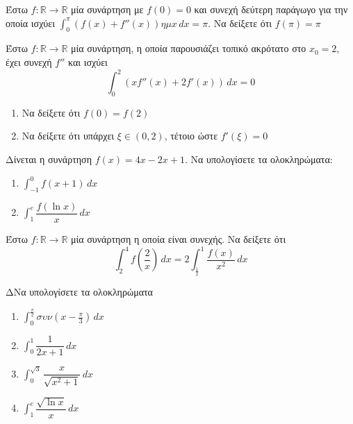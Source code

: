 \documentclass{presentation}
\begin{document}
\begin{askisi}
    Έστω $f:\mathbb{R}\to\mathbb{R}$ μία συνάρτηση με $f(0)=0$ και συνεχή δεύτερη παράγωγο για την οποία ισχύει $\int_{0}^{π} \left( f(x)+f''(x) \right)ημx  \,dx=π$. Να δείξετε ότι $f(π)=π$

\end{askisi}

\begin{askisi}
    Έστω $f:\mathbb{R}\to\mathbb{R}$ μία συνάρτηση, η οποία παρουσιάζει τοπικό ακρότατο στο $x_0=2$, έχει συνεχή $f''$ και ισχύει
    $$\int_{0}^{2} \left( xf''(x)+2f'(x) \right) \,dx=0$$
    \begin{enumerate}
        \item<1-> Να δείξετε ότι $f(0)=f(2)$
        \item<2-> Να δείξετε ότι υπάρχει $ξ\in (0,2)$, τέτοιο ώστε $f'(ξ)=0$
    \end{enumerate}

\end{askisi}

\begin{askisi}
    Δίνεται η συνάρτηση $f(x)=4x-2x+1$. Να υπολογίσετε τα ολοκληρώματα:
    \begin{enumerate}
        \item<1-> $\int_{-1}^{0} f(x+1) \,dx$
        \item<2-> $\int_{1}^{e} \dfrac{f(\ln x)}{x} \,dx$
    \end{enumerate}

\end{askisi}

\begin{askisi}
    Έστω $f:\mathbb{R}\to\mathbb{R}$ μία συνάρτηση η οποία είναι συνεχής. Να δείξετε ότι
    $$\int_{2}^{4} f\left( \dfrac{2}{x} \right)  \,dx=2\int_{\frac{1}{2}}^{1} \dfrac{f(x)}{x^2} \,dx$$

\end{askisi}

\begin{askisi}
    ΔΝα υπολογίσετε τα ολοκληρώματα
    \begin{enumerate}
        \item<1-> $\int_{0}^{\frac{π}{2}} συν(x-\frac{π}{3}) \,dx$
        \item<2-> $\int_{0}^{1} \dfrac{1}{2x+1} \,dx$
        \item<3-> $\int_{0}^{\sqrt{3}} \dfrac{x}{\sqrt{x^2+1}} \,dx$
        \item<4-> $\int_{1}^{e} \dfrac{\sqrt{\ln x}}{x} \,dx$
    \end{enumerate}

\end{askisi}
\end{document}
